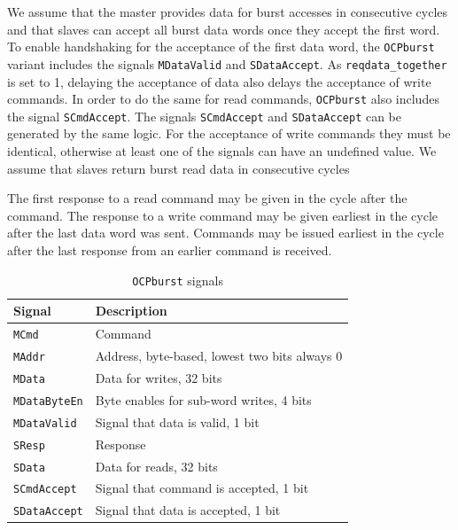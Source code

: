 \documentclass[a4paper,fontsize=10pt,twoside,DIV15,BCOR12mm,headinclude=true,footinclude=false,pagesize,bibtotoc]{scrbook}
\newcommand{\code}[1]{{\texttt{#1}}}
\newcommand{\comment}[3]{

\textsf{\textbf{#1}} {\color{#3}#2}}
\newcommand{\wolf}[1]{\comment{Wolfgang}{#1}{OliveGreen}}
\newcommand{\martin}[1]{\comment{Martin}{#1}{Blue}}
\renewcommand{\wolf}[1]{}
\renewcommand{\martin}[1]{}
\begin{document}
We assume that the master provides data for burst accesses in
consecutive cycles and that slaves can accept all burst data words
once they accept the first word. To enable handshaking for the
acceptance of the first data word, the \code{OCPburst} variant
includes the signals \code{MDataValid} and \code{SDataAccept}. As
\code{reqdata\_together} is set to 1, delaying the acceptance of data
also delays the acceptance of write commands. In order to do the same
for read commands, \code{OCPburst} also includes the signal
\code{SCmdAccept}. The signals \code{SCmdAccept} and
\code{SDataAccept} can be generated by the same logic. For the
acceptance of write commands they must be identical, otherwise at
least one of the signals can have an undefined value. We assume that
slaves return burst read data in consecutive cycles

The first response to a read command may be given in the cycle after
the command. The response to a write command may be given earliest in
the cycle after the last data word was sent. Commands may be issued
earliest in the cycle after the last response from an earlier command
is received.
\martin{Having a write response one cycle after the last data and not
allowing a command in that cycle costs us one additional clock cycle
(in the TDM slot). Maybe it doe not matter.}
\wolf{The consensus was that it would not matter. We could change it
  if we make sure all slaves comply, the restriction was basically just
  put in to be on the safe side.}

\begin{table}
  \centering
  \caption{\code{OCPburst} signals}
  \label{tab:burstsignals}
  \begin{tabular}{ll}
    \toprule
    Signal & Description \\
    \midrule
    \code{MCmd} & Command \\
    \code{MAddr} & Address, byte-based, lowest two bits always 0 \\
    \code{MData} & Data for writes, 32 bits \\
    \code{MDataByteEn} & Byte enables for sub-word writes, 4 bits \\
    \code{MDataValid} & Signal that data is valid, 1 bit \\
    \cmidrule{1-2}
    \code{SResp} & Response \\
    \code{SData} & Data for reads, 32 bits \\
    \code{SCmdAccept} & Signal that command is accepted, 1 bit \\
    \code{SDataAccept} & Signal that data is accepted, 1 bit \\
    \bottomrule
  \end{tabular}
\end{table}
\end{document}
